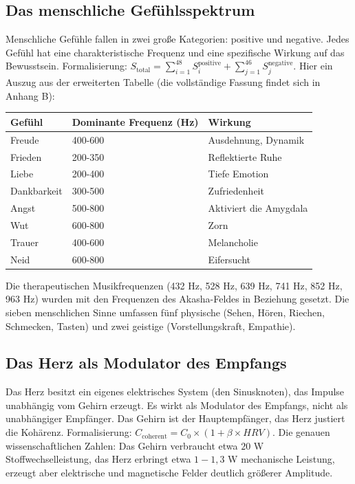 \subsection{Das menschliche Gefühlsspektrum}
Menschliche Gefühle fallen in zwei große Kategorien: positive und negative. Jedes Gefühl hat eine charakteristische Frequenz und eine spezifische Wirkung auf das Bewusstsein. Formalisierung: $S_{\text{total}} = \sum_{i=1}^{48} S_i^{\text{positive}} + \sum_{j=1}^{46} S_j^{\text{negative}}$. Hier ein Auszug aus der erweiterten Tabelle (die vollständige Fassung findet sich in Anhang B):
\begin{table}[H]
\centering
\begin{tabular}{@{}lll@{}}
\toprule
\textbf{Gefühl} & \textbf{Dominante Frequenz (Hz)} & \textbf{Wirkung} \\ \midrule
Freude & 400-600 & Ausdehnung, Dynamik \\
Frieden & 200-350 & Reflektierte Ruhe \\
Liebe & 200-400 & Tiefe Emotion \\
Dankbarkeit & 300-500 & Zufriedenheit \\
Angst & 500-800 & Aktiviert die Amygdala \\
Wut & 600-800 & Zorn \\
Trauer & 400-600 & Melancholie \\
Neid & 600-800 & Eifersucht \\ \bottomrule
\end{tabular}
\end{table}
Die therapeutischen Musikfrequenzen (432 Hz, 528 Hz, 639 Hz, 741 Hz, 852 Hz, 963 Hz) wurden mit den Frequenzen des Akasha-Feldes in Beziehung gesetzt. Die sieben menschlichen Sinne umfassen fünf physische (Sehen, Hören, Riechen, Schmecken, Tasten) und zwei geistige (Vorstellungskraft, Empathie).

\subsection{Das Herz als Modulator des Empfangs}
Das Herz besitzt ein eigenes elektrisches System (den Sinusknoten), das Impulse unabhängig vom Gehirn erzeugt. Es wirkt als Modulator des Empfangs, nicht als unabhängiger Empfänger. Das Gehirn ist der Hauptempfänger, das Herz justiert die Kohärenz. Formalisierung: $C_{\text{coherent}} = C_0 \times (1 + \beta \times HRV)$. Die genauen wissenschaftlichen Zahlen: Das Gehirn verbraucht etwa $20$ W Stoffwechselleistung, das Herz erbringt etwa $1-1,3$ W mechanische Leistung, erzeugt aber elektrische und magnetische Felder deutlich größerer Amplitude.

